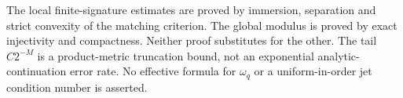 \begin{remark}
\label{rem:v24-exact-versus-stable}
The local finite-signature estimates are proved by immersion, separation and
strict convexity of the matching criterion.  The global modulus is proved
by exact injectivity and compactness.  Neither proof substitutes for the
other.  The tail \(C2^{-M}\) is a product-metric truncation bound, not an
exponential analytic-continuation error rate.  No effective formula for
\(\omega_q\) or a uniform-in-order jet condition number is asserted.
\end{remark}
